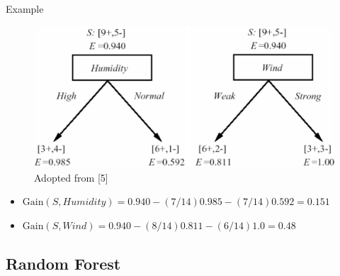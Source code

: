 \documentclass[serif, aspectratio=169]{beamer}
\begin{document}
\begin{frame}{Example}
    \begin{center}
    \begin{figure}[bh]
        \includegraphics[width=\textwidth]{pic/informationgain.png}
        {\scriptsize Adopted from [5]}
    \end{figure}
    \endminipage
    \end{center}

    \begin{itemize}
    \itemsep1em
    \justifying
    \item[] $\text{Gain}(S, Humidity) = 0.940 - (7/14) 0.985 - (7/14) 0.592 = 0.151$
    \item[] $\text{Gain}(S, Wind) = 0.940 - (8/14) 0.811 - (6/14) 1.0 = 0.48$
    \end{itemize}
\end{frame}

\subsection{Random Forest}
\end{document}

